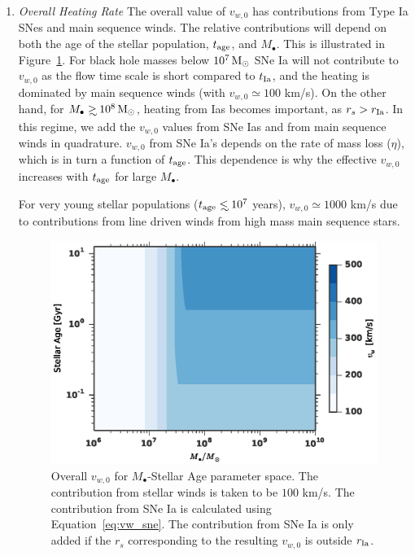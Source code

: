 \documentclass[usenatbib,fleqn]{mn2e}
\newcommand\lsim{\mathrel{\rlap{\lower4pt\hbox{\hskip1pt$\sim$}}
    \raise1pt\hbox{$<$}}}
\newcommand\gsim{\mathrel{\rlap{\lower4pt\hbox{\hskip1pt$\sim$}}
    \raise1pt\hbox{$>$}}}
\newcommand{\rs}{r_s}
\newcommand{\Mbh}[1][]{M_{\bullet#1}}
\newcommand{\rIa}{r_{\rm Ia}}
\newcommand{\vwO}{v_{w,0}}
\newcommand{\tage}{t_{\rm age}}
\begin{document}
\begin{enumerate}
\item \emph{Overall Heating Rate} The overall value of $\vwO$ has
  contributions from Type Ia SNes and main sequence winds.  The
  relative contributions will depend on both the age of the stellar
  population, $\tage$, and $\Mbh$.  This is illustrated in
  Figure~\ref{fig:vweff}. For black hole masses below $10^7 \,{\rm M_\odot}$ SNe
  Ia will not contribute to $\vwO$ as the flow time scale is short
  compared to $t_{\rm Ia}$, and the heating is dominated by main
  sequence winds (with $\vwO\simeq 100$ km/s).  On the other hand, for
  $\Mbh \gsim 10^8 \Msun$, heating from Ias becomes important, as
  $\rs>\rIa$. In this regime, we add the $\vwO$ values from SNe Ias
  and from main sequence winds in quadrature. $\vwO$ from SNe Ia's
  depends on the rate of mass loss ($\eta$), which is in turn a
  function of $t_{\rm age}$. This dependence is why the effective
  $\vwO$ increases with $\tage$ for large $\Mbh$.

  For very young stellar populations ($\tage \lsim 10^7$ years),
  $\vwO\simeq 1000$ km/s due to contributions from line driven winds
  from high mass main sequence stars.

  \begin{figure}
    \includegraphics[width=\columnwidth]{vw-contour.eps}
    \caption{\label{fig:vweff} Overall $\vwO$ for $\Mbh$-Stellar Age
      parameter space. The contribution from stellar winds is taken to
      be $100$ km/s. The contribution from SNe Ia is calculated using
      Equation~\ref{eq:vw_sne}. The contribution from SNe Ia is only
      added if the $r_s$ corresponding to the resulting $\vwO$ is
      outside $\rIa$.}%
  \end{figure}

\end{enumerate}
\end{document}
